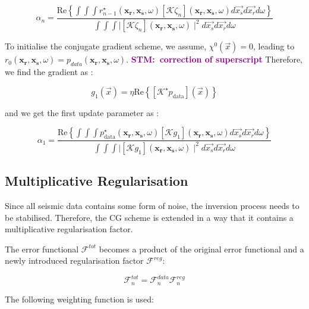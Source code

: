 \documentclass[10pt,a4paper]{article}
\newcommand{\real}[1]{\text{Re} \left\{ #1 \right\}}
\newcommand{\commentstmtwo}[1]{\textcolor{purple}{\textbf{STM:\ #1}}}
\begin{document}
\begin{equation} \label{eq:eq17} \alpha_n = \frac {\real {\int \int \int r^{\star}_{n-1}(\mathbf{x_\text{r}},\mathbf{x_\text{s}},\omega)[\mathcal{K} \zeta_n](\mathbf{x_\text{r}},\mathbf{x_\text{s}},\omega)d\vec{x_s}d\vec{x_r}d\omega}}{\int \int \int \mid[\mathcal{K} \zeta_n](\mathbf{x_\text{r}},\mathbf{x_\text{s}},\omega) \mid^2 d\vec{x_s}d\vec{x_r}d\omega} \end{equation}

To initialise the conjugate gradient scheme, we assume, $\chi^0 (\vec{x}) = 0$, leading to $r_0(\mathbf{x_\text{r}},\mathbf{x_\text{s}},\omega) = p_{data}(\mathbf{x_\text{r}},\mathbf{x_\text{s}},\omega)$.
\commentstmtwo{correction of superscript}
Therefore, we find the gradient as :

\begin{equation} \label{eq:eq18} g_1(\vec{x}) = \eta \real{[\mathcal{K}^\star p_\text{data}](\vec{x})} \end{equation}

and we get the first update parameter as :

\begin{equation} \label{eq:eq19} \alpha_1 = \frac {\real {\int \int \int p^{\star}_\text{data}(\mathbf{x_\text{r}},\mathbf{x_\text{s}},\omega)[\mathcal{K} g_1](\mathbf{x_\text{r}},\mathbf{x_\text{s}},\omega)d\vec{x_s}d\vec{x_r}d\omega}}{\int \int \int \mid[\mathcal{K} g_1](\mathbf{x_\text{r}},\mathbf{x_\text{s}},\omega) \mid^2 d\vec{x_s}d\vec{x_r}d\omega} \end{equation}


\subsection{Multiplicative Regularisation}

Since all seismic data contains some form of noise, the inversion process needs to be stabilised. Therefore, the CG scheme is extended in a way that it contains a multiplicative regularisation factor.

The error functional $\mathcal{F}^{tot}$ becomes a product of the original error functional and a newly introduced regularisation factor $\mathcal{F}^{reg}$:

\begin{equation} \label{eq:eq20} \mathcal{F}^{tot}_n = \mathcal{F}^{data}_n \mathcal{F}^{reg}_n \end{equation}

The following weighting function is used:
\end{document}
